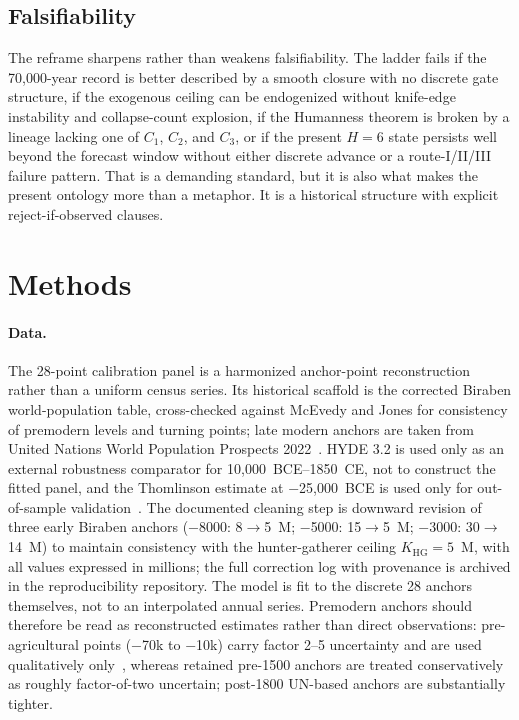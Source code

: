 \documentclass[11pt]{article}
\begin{document}
\subsection*{Falsifiability}

The reframe sharpens rather than weakens falsifiability.
The ladder fails if the 70,000-year record is better described by a smooth closure with no discrete gate structure,
if the exogenous ceiling can be endogenized without knife-edge instability and collapse-count explosion,
if the Humanness theorem is broken by a lineage lacking one of
\(C_1\),
\(C_2\),
and
\(C_3\),
or if the present
\(H{=}6\)
state persists well beyond the forecast window without either discrete advance or a route-I/II/III failure pattern.
That is a demanding standard,
but it is also what makes the present ontology more than a metaphor.
It is a historical structure with explicit reject-if-observed clauses.

\section{Methods}

\paragraph{Data.}
The 28-point calibration panel is a harmonized anchor-point reconstruction rather than a uniform census series.
Its historical scaffold is the corrected Biraben world-population table,
cross-checked against McEvedy and Jones for consistency of premodern levels and turning points;
late modern anchors are taken from United Nations World Population Prospects 2022~\cite{biraben1979,mcevedy1978,unwpp2022}.
HYDE 3.2 is used only as an external robustness comparator for 10,000~BCE--1850~CE,
not to construct the fitted panel,
and the Thomlinson estimate at
\(-\)25,000~BCE is used only for out-of-sample validation~\cite{goldewijk2017,thomlinson1975}.
The documented cleaning step is downward revision of three early Biraben anchors
(\(-\)8000:
8\(\to\)5~M;
\(-\)5000:
15\(\to\)5~M;
\(-\)3000:
30\(\to\)14~M)
to maintain consistency with the hunter-gatherer ceiling
\(K_{\mathrm{HG}}=5\)~M,
with all values expressed in millions;
the full correction log with provenance is archived in the reproducibility repository.
The model is fit to the discrete 28 anchors themselves,
not to an interpolated annual series.
Premodern anchors should therefore be read as reconstructed estimates rather than direct observations:
pre-agricultural points
(\(-\)70k to \(-\)10k)
carry factor 2--5 uncertainty and are used qualitatively only~\cite{hassan1981,ambrose1998},
whereas retained pre-1500 anchors are treated conservatively as roughly factor-of-two uncertain;
post-1800 UN-based anchors are substantially tighter.
\end{document}
